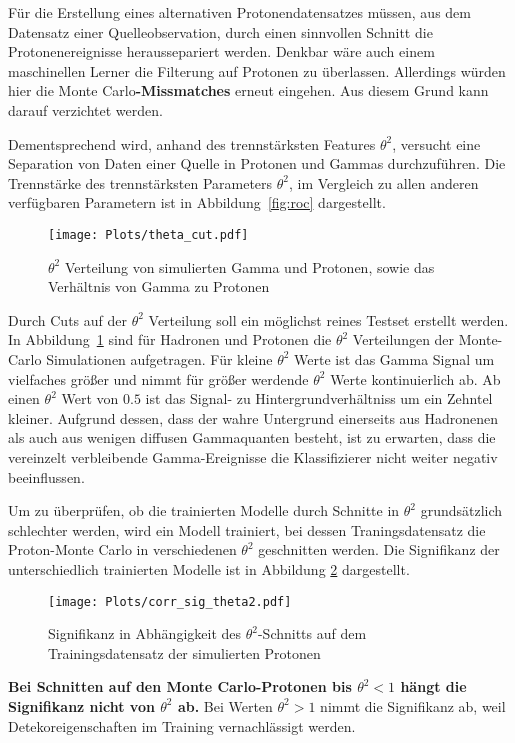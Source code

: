 Für die Erstellung eines alternativen Protonendatensatzes müssen, aus dem Datensatz einer Quelleobservation, durch einen sinnvollen Schnitt die Protonenereignisse heraussepariert werden. 
Denkbar wäre auch einem maschinellen Lerner die Filterung auf Protonen zu überlassen.
Allerdings würden hier die Monte Carlo\textbf{-Missmatches} erneut eingehen. Aus diesem Grund kann darauf verzichtet werden.

Dementsprechend wird, anhand des trennstärksten Features $\theta^{2}$, versucht eine Separation von Daten einer Quelle in Protonen und Gammas durchzuführen. 
Die Trennstärke des trennstärksten Parameters $\theta^{2}$, im Vergleich zu allen anderen verfügbaren Parametern ist in Abbildung~\ref{fig:roc} dargestellt. 
\begin{figure}[H]
  \centering
  \texttt{[image: Plots/theta\_cut.pdf]}
  \caption{$\theta^{2}$ Verteilung von simulierten Gamma und Protonen, sowie das Verhältnis von Gamma zu Protonen}
  \label{fig:thetacut}
\end{figure}
Durch Cuts auf der $\theta^{2}$ Verteilung soll ein möglichst reines Testset erstellt werden. 
In Abbildung~\ref{fig:thetacut} sind für Hadronen und Protonen die $\theta^{2}$ Verteilungen der Monte-Carlo Simulationen aufgetragen. 
Für kleine $\theta^{2}$ Werte ist das Gamma Signal um vielfaches größer und nimmt für größer werdende $\theta^{2}$ Werte kontinuierlich ab. 
Ab einen $\theta^{2}$ Wert von $0.5$ ist das Signal- zu Hintergrundverhältniss um ein Zehntel kleiner.
Aufgrund dessen, dass der wahre Untergrund einerseits aus Hadronenen als auch aus wenigen diffusen Gammaquanten besteht, ist zu erwarten, dass die vereinzelt verbleibende Gamma-Ereignisse die Klassifizierer nicht weiter negativ beeinflussen.

Um zu überprüfen, ob die trainierten Modelle durch Schnitte in $\theta^{2}$ grundsätzlich schlechter werden, wird ein Modell trainiert, bei dessen Traningsdatensatz die Proton-Monte Carlo in verschiedenen $\theta^{2}$ geschnitten werden. 
Die Signifikanz der unterschiedlich trainierten Modelle ist in Abbildung \ref{fig:corrtheta} dargestellt.
\begin{figure}[H]
  \centering
  \texttt{[image: Plots/corr\_sig\_theta2.pdf]}
  \caption{Signifikanz in Abhängigkeit des $\theta^{2}$-Schnitts auf dem Trainingsdatensatz der simulierten Protonen}
  \label{fig:corrtheta}
\end{figure}
\textbf{Bei Schnitten auf den Monte Carlo-Protonen bis $\theta^{2} < 1$ hängt die Signifikanz nicht von $\theta^{2}$ ab.}
Bei Werten $\theta^{2} > 1$ nimmt die Signifikanz ab, weil Detekoreigenschaften im Training vernachlässigt werden.

